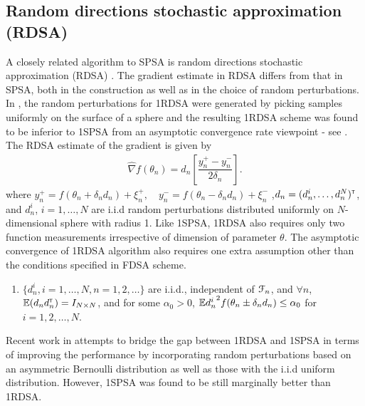 \subsection{Random directions stochastic approximation (RDSA)}
A closely related algorithm to SPSA is random directions stochastic approximation (RDSA) \cite[pp.~58-60]{kushcla}. The gradient estimate in RDSA differs from that in SPSA, both in the construction as well as in the choice of random perturbations.  In \cite{kushcla}, the random perturbations for 1RDSA were generated by picking samples uniformly on the surface of a sphere and the resulting 1RDSA scheme was found to be  inferior to 1SPSA from an asymptotic convergence rate viewpoint - see \cite{chin1997comparative}.  
The RDSA estimate of the gradient is given by
\begin{align}
\label{eq:grad-unif}
\widehat\nabla f(\theta_n) = d_n \left[ \dfrac{y_n^+ - y_n^-}{2\delta_n}\right].
\end{align}
where $y_{n}^+ = f(\theta_n+\delta_n d_n) + \xi_{n}^+,\quad y_{n}^- = f(\theta_n-\delta_n d_n) + \xi_{n}^-$ ,$d_n = (d_n^i,\ldots,d_n^N)^\mathsf{\scriptscriptstyle T}$, and $d_n^i$, $ i=1,\ldots,N$ are i.i.d random perturbations distributed uniformly on $N$-dimensional sphere with radius 1. Like 1SPSA, 1RDSA also requires only two function measurements irrespective of dimension of parameter $\theta$. 
The asymptotic convergence of 1RDSA algorithm also requires one extra assumption other than the conditions specified in FDSA scheme. 
\begin{enumerate}[label=(\textbf{A\arabic*}),resume]
\item $\{ d_{n}^i, i=1,\ldots,N, n=1,2,\ldots\}$ are i.i.d., independent of $\mathcal{F}_n$, and $\forall n$, $\mathbb{E} (d_{n} d_{n}^\mathsf{\scriptscriptstyle T}) = I_{N \times N}$, and for some $\alpha_0 > 0$, $\mathbb{E} {d_{n}^i}^2 f(\theta_n \pm \delta_n d_n) \le \alpha_0$ for $i=1,2,\ldots,N$.
\end{enumerate}
Recent work in \cite{prashanth2015rdsa} attempts to bridge the gap between 1RDSA and 1SPSA in terms of improving the performance by incorporating random perturbations based on an asymmetric Bernoulli
distribution as well as those with the  i.i.d uniform distribution. However,  1SPSA was found to be still marginally better than 1RDSA.  
